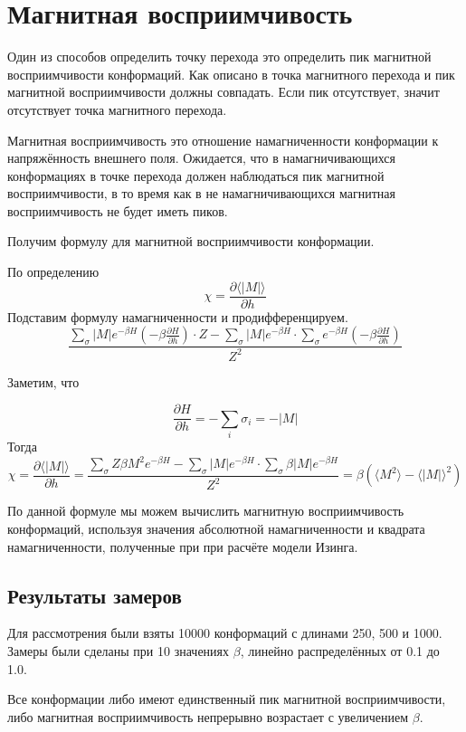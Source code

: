 \section{Магнитная восприимчивость}
Один из способов определить точку перехода это определить пик магнитной восприимчивости конформаций. Как описано в \cite{swendsen} точка магнитного перехода и пик магнитной восприимчивости должны совпадать. Если пик отсутствует, значит отсутствует точка магнитного перехода.

Магнитная восприимчивость это отношение намагниченности конформации к напряжённость внешнего поля. Ожидается, что в намагничивающихся конформациях в точке перехода должен наблюдаться пик магнитной восприимчивости, в то время как в не намагничивающихся магнитная восприимчивость не будет иметь пиков.

Получим формулу для магнитной восприимчивости конформации.

По определению
\[
	\chi = \frac{\partial\langle |M|\rangle}{\partial h}
\]
Подставим формулу намагниченности и продифференцируем.
\[
	\frac{\sum_\sigma {|M| e^{-\beta H} \left( -\beta \frac{\partial H}{\partial h}\right)} \cdot Z - \sum_\sigma {|M| e^{-\beta H}} \cdot \sum_\sigma {e^{-\beta H} \left( -\beta \frac{\partial H}{\partial h}\right)}}{Z^2}
\]

Заметим, что

\[
	\frac{\partial H}{\partial h} = -\sum_i\sigma_i = -|M|
\]
Тогда
\[
	\chi = \frac{\partial\langle |M|\rangle}{\partial h} = \frac{\sum_\sigma {Z\beta M^2 e^{-\beta H}} - \sum_\sigma {|M| e^{-\beta H}}\cdot \sum_\sigma {\beta |M| e^{-\beta H}}}{Z^2} = \beta \left(\langle M^2\rangle - \langle |M| \rangle^2 \right)
\]


По данной формуле мы можем вычислить магнитную восприимчивость конформаций, используя значения абсолютной намагниченности и квадрата намагниченности, полученные при при расчёте модели Изинга.



\subsection{Результаты замеров}
Для рассмотрения были взяты 10000 конформаций с длинами 250, 500 и 1000. Замеры были сделаны при 10 значениях $\beta$, линейно распределённых от 0.1 до 1.0.

Все конформации либо имеют единственный пик магнитной восприимчивости, либо магнитная восприимчивость непрерывно возрастает с увеличением $\beta$.

